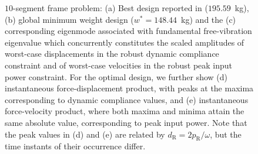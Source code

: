 \documentclass[preprint,3p]{elsarticle}
\newcommand{\TC}{^{\mathsf H}}
\newcommand{\R}{\mathrm{R}}
\numberwithin{equation}{section}
\begin{document}
\begin{figure}[!t]
\begin{subfigure}{0.45\linewidth}
\caption{}
\label{fig:cantilever20_power}
\end{subfigure}
\caption{$10$-segment frame problem: (a) Best design reported in \citep{Ni2014} ($195.59$~kg), (b) global minimum weight design ($w^*=148.44$~kg) and the (c) corresponding eigenmode associated with fundamental free-vibration eigenvalue which concurrently constitutes the scaled amplitudes of worst-case displacements in the robust dynamic compliance constraint and of worst-case velocities in the robust peak input power constraint. For the optimal design, we further show (d) instantaneous force-displacement product, with peaks at the maxima corresponding to dynamic compliance values, and (e) instantaneous force-velocity product, where both maxima and minima attain the same absolute value, corresponding to peak input power. Note that the peak values in (d) and (e) are related by $d_\R = 2p_\R/\omega$, but the time instants of their occurrence differ.}
\label{fig:cantilever20}
\end{figure}
\end{document}
